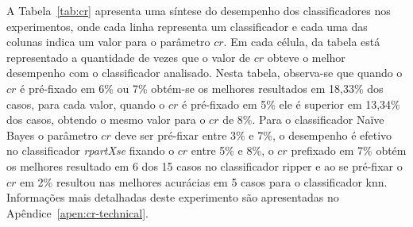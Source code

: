     A Tabela~\ref{tab:cr} apresenta uma síntese do desempenho dos classificadores nos experimentos, onde cada linha representa um classificador e cada uma das colunas indica um valor para o parâmetro $cr$. Em cada célula, da tabela está representado a quantidade de vezes que o valor de $cr$ obteve o melhor desempenho com o classificador analisado. Nesta tabela, observa\hyp{se} que quando o $cr$ é pré\hyp{fixado} em 6\% ou 7\% obtém\hyp{se} os melhores resultados em 18,33\% dos casos, para cada valor, quando o $cr$ é pré\hyp{fixado} em 5\% ele é superior em 13,34\% dos casos, obtendo o mesmo valor para o $cr$ de 8\%. Para o classificador Naïve Bayes o parâmetro $cr$ deve ser pré\hyp{fixar} entre 3\% e 7\%, o desempenho é efetivo no classificador \textit{rpartXse} fixando o $cr$ entre 5\% e 8\%, o $cr$ prefixado em 7\% obtém os melhores resultado em 6 dos 15 casos no classificador \ac{ripper} e ao se pré\hyp{fixar} o $cr$ em 2\% resultou nas melhores acurácias em 5 casos para o classificador \ac{knn}. Informações mais detalhadas deste experimento são apresentadas no Apêndice~\ref{apen:cr-technical}.
    
    \begin{table}[h]
        \centering
        \caption{Desempenho associado a cada valor do parâmetro $cr$}
        \label{tab:cr}
    \end{table}
    
